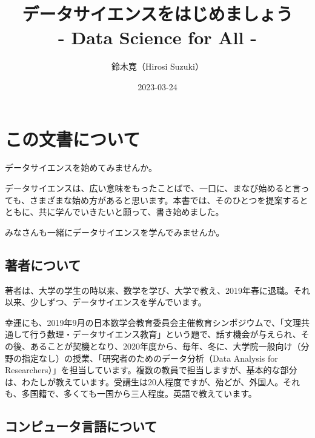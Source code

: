 \documentclass[
]{bxjsbook}
\title{データサイエンスをはじめましょう\\
- Data Science for All -}
\author{鈴木寛（Hirosi Suzuki）}
\date{2023-03-24}
\theoremstyle{definition}
\theoremstyle{definition}
\theoremstyle{definition}
\theoremstyle{definition}
\theoremstyle{remark}
\begin{document}
\maketitle

{
\setcounter{tocdepth}{2}
\tableofcontents
}
\hypertarget{ux3053ux306eux6587ux66f8ux306bux3064ux3044ux3066}{%
\section*{この文書について}\label{ux3053ux306eux6587ux66f8ux306bux3064ux3044ux3066}}

データサイエンスを始めてみませんか。

データサイエンスは、広い意味をもったことばで、一口に、まなび始めると言っても、さまざまな始め方があると思います。本書では、そのひとつを提案するとともに、共に学んでいきたいと願って、書き始めました。

みなさんも一緒にデータサイエンスを学んでみませんか。

\hypertarget{ux8457ux8005ux306bux3064ux3044ux3066}{%
\subsection*{著者について}\label{ux8457ux8005ux306bux3064ux3044ux3066}}

著者は、大学の学生の時以来、数学を学び、大学で教え、2019年春に退職。それ以来、少しずつ、データサイエンスを学んでいます。

幸運にも、2019年9月の日本数学会教育委員会主催教育シンポジウムで、「文理共通して行う数理・データサイエンス教育」という題で、話す機会が与えられ、その後、あることが契機となり、2020年度から、毎年、冬に、大学院一般向け（分野の指定なし）の授業、「研究者のためのデータ分析（Data Analysis for Researchers）」を担当しています。複数の教員で担当しますが、基本的な部分は、わたしが教えています。受講生は20人程度ですが、殆どが、外国人。それも、多国籍で、多くても一国から三人程度。英語で教えています。

\hypertarget{ux30b3ux30f3ux30d4ux30e5ux30fcux30bfux8a00ux8a9eux306bux3064ux3044ux3066}{%
\subsection*{コンピュータ言語について}\label{ux30b3ux30f3ux30d4ux30e5ux30fcux30bfux8a00ux8a9eux306bux3064ux3044ux3066}}
\end{document}
